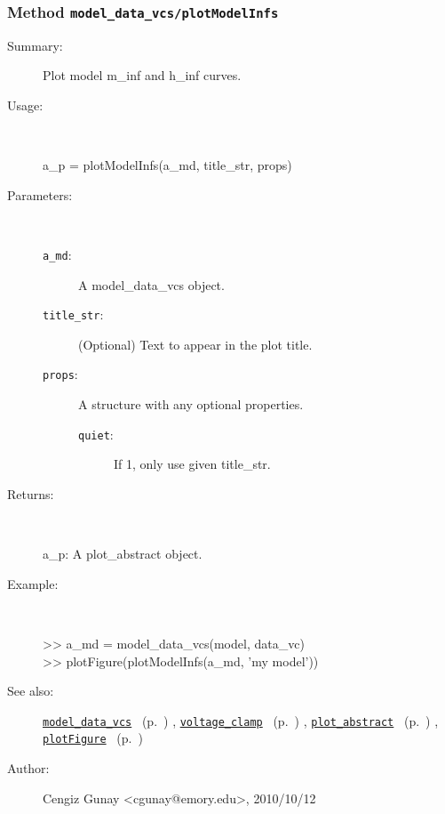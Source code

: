 \subsubsection[Method \texttt{plotModelInfs}]{Method \texttt{model\_data\_vcs/plotModelInfs}}%
%
\label{ref_model_data_vcs__plotModelInfs}%
\hypertarget{ref_model_data_vcs__plotModelInfs}{}%
\begin{description}
\item[Summary:]Plot model m\_inf and h\_inf curves.
%
\item[Usage:]~%
\begin{lyxcode}%
a\_p = plotModelInfs(a\_md, title\_str, props)
%
\end{lyxcode}%
%
%
\item[Parameters:]~
\begin{description}%
\item[\texttt{a\_md}:]
 A model\_data\_vcs object.
\item[\texttt{title\_str}:]
 (Optional) Text to appear in the plot title.
\item[\texttt{props}:]
 A structure with any optional properties.
\begin{description}%
\item[\texttt{quiet}:]
 If 1, only use given title\_str.
\end{description}%
\end{description}%
%
\item[Returns:
]~

   a\_p: A plot\_abstract object.
%
\item[Example:]~
\begin{lyxcode} >> a\_md = model\_data\_vcs(model, data\_vc)
\\%
 >> plotFigure(plotModelInfs(a\_md, 'my model'))
\\%
\end{lyxcode}
%
\item[See also:]%
\hyperlink{ref_model_data_vcs}{\texttt{model\_data\_vcs}}%
\ (p.~\pageref{ref_model_data_vcs})%
%
, \hyperlink{ref_voltage_clamp}{\texttt{voltage\_clamp}}%
\ (p.~\pageref{ref_voltage_clamp})%
%
, \hyperlink{ref_plot_abstract}{\texttt{plot\_abstract}}%
\ (p.~\pageref{ref_plot_abstract})%
%
, \hyperlink{ref_plotFigure}{\texttt{plotFigure}}%
\ (p.~\pageref{ref_plotFigure})%
%
%
\item[Author:]%
Cengiz Gunay <cgunay@emory.edu>, 2010/10/12
%
\end{description}
\methodline%
